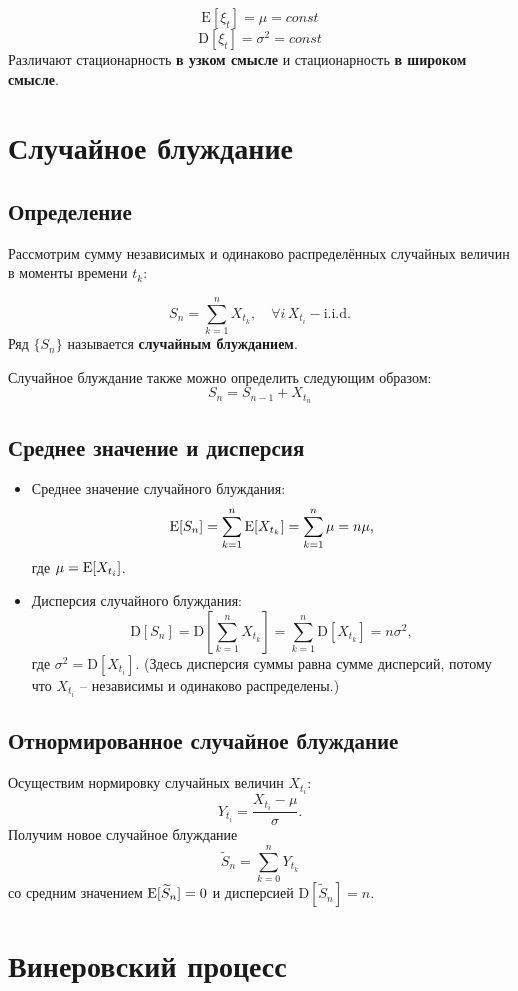 \documentclass{article}
\begin{document}
$$\textrm{E}[\xi_t] = \mu = const$$
$$\textrm{D}[\xi_t] = \sigma^2 = const$$
Различают стационарность \textbf{в узком смысле} и стационарность \textbf{в широком смысле}.

\section{Случайное блуждание}
\subsection{Определение}
Рассмотрим сумму независимых и одинаково распределённых случайных величин в моменты времени $t_k$:

$$S_n = \sum_{k=1}^n X_{t_k}, \quad \forall i \, X_{t_i} - \textrm{i.i.d.} $$
Ряд $\{S_n\}$ называется \textbf{случайным блужданием}.

\noindent
Случайное блуждание также можно определить следующим образом:
$$S_n = S_{n-1} + X_{t_n}$$

\subsection{Среднее значение и дисперсия} \label{ssec:random-walk-mean-variance}
\begin{itemize}
    \item{
        Среднее значение случайного блуждания:
        $$\textrm{E}[S_n] = \sum_{k=1}^n \textrm{E}[X_{t_k}] = \sum_{k=1}^n \mu = n \mu,$$
        где $\mu = \textrm{E}[X_{t_i}]$.
    }
    \item{
        Дисперсия случайного блуждания:
        $$
        \textrm{D}[S_n] = 
        \textrm{D}\left[\sum_{k=1}^n X_{t_k} \right] =
        \sum_{k=1}^n \textrm{D}[X_{t_k}] = 
        n \sigma^2,
        $$ 
        где $\sigma^2 = \textrm{D}[X_{t_i}]$. (Здесь дисперсия суммы равна сумме дисперсий, потому что $X_{t_i}$ -- независимы и одинаково распределены.)
    }
\end{itemize}

\subsection{Отнормированное случайное блуждание}
Осуществим нормировку случайных величин $X_{t_i}$:
$$Y_{t_i} = \frac{X_{t_i} - \mu}{\sigma}.$$
Получим новое случайное блуждание
$$\widetilde S_n = \sum_{k=0}^n Y_{t_k}$$
со средним значением $\textrm{E}[\widetilde S_n] = 0$ и дисперсией $\textrm{D}[\widetilde S_n] = n$.

\section{Винеровский процесс}
\end{document}
